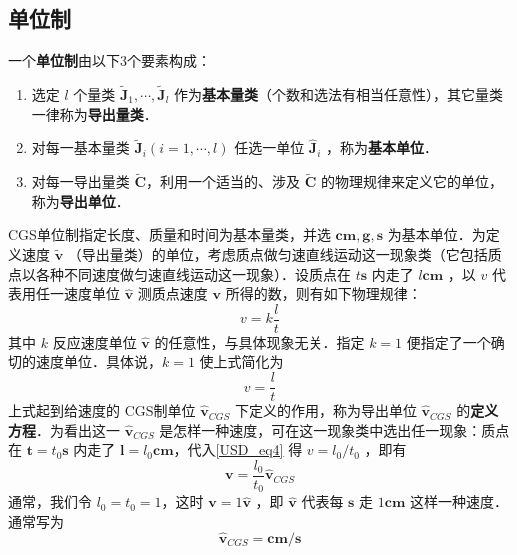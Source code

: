 \subsection{单位制}
一个\textbf{单位制}由以下3个要素构成：
\begin{enumerate}
\item 选定 $l$ 个量类 $\tilde{\boldsymbol{J}}_1,\cdots,\tilde{\boldsymbol{J}}_l$ 作为\textbf{基本量类}（个数和选法有相当任意性），其它量类一律称为\textbf{导出量类}．  
\item 对每一基本量类 $\tilde{\boldsymbol{J}}_i(i=1,\cdots,l)$ 任选一单位 $\hat{\boldsymbol{J}}_i$ ，称为\textbf{基本单位}．
\item 对每一导出量类 $\tilde{\boldsymbol{C}}$，利用一个适当的、涉及 $\tilde{\boldsymbol{C}}$ 的物理规律来定义它的单位，称为\textbf{导出单位}．
\end{enumerate}
\begin{example}{}
CGS单位制指定长度、质量和时间为基本量类，并选 $\boldsymbol{cm},\boldsymbol{g},\boldsymbol{s}$ 为基本单位．为定义速度 $\tilde{\boldsymbol{v}}$ （导出量类）的单位，考虑质点做匀速直线运动这一现象类（它包括质点以各种不同速度做匀速直线运动这一现象）．设质点在 $t\boldsymbol{s}$ 内走了 $l\boldsymbol{cm}$ ，以 $v$ 代表用任一速度单位 $\hat{\boldsymbol{v}}$ 测质点速度 $\boldsymbol{v}$ 所得的数，则有如下物理规律：
\begin{equation}
v=k\frac{l}{t}
\end{equation}
其中 $k$ 反应速度单位 $\hat{\boldsymbol{v}}$ 的任意性，与具体现象无关．指定 $k=1$ 便指定了一个确切的速度单位．具体说，$k=1$ 使上式简化为
\begin{equation}\label{USD_eq4}
v=\frac{l}{t}
\end{equation}
上式起到给速度的 CGS制单位 $\hat{\boldsymbol{v}}_{CGS}$ 下定义的作用，称为导出单位 $\hat{\boldsymbol{v}}_{CGS}$ 的\textbf{定义方程}．为看出这一 $\hat{\boldsymbol{v}}_{CGS}$ 是怎样一种速度，可在这一现象类中选出任一现象：质点在 $\boldsymbol{t}=t_0\boldsymbol{s}$ 内走了 $\boldsymbol{l}=l_0\boldsymbol{cm}$，代入\autoref{USD_eq4} 得 $v=l_0/t_0$ ，即有
\begin{equation}
\boldsymbol{v}=\frac{l_0}{t_0}\hat{\boldsymbol{v}}_{CGS}
\end{equation}
通常，我们令 $l_0=t_0=1$，这时 $\boldsymbol{v}=1\hat{\boldsymbol{v}}$ ，即 $\hat{\boldsymbol{v}}$ 代表每 $\boldsymbol{s}$ 走 $1\boldsymbol{cm}$ 这样一种速度．通常写为
\begin{equation}
\hat{\boldsymbol{v}}_{CGS}=\boldsymbol{cm}/\boldsymbol{s}
\end{equation}


\end{example}